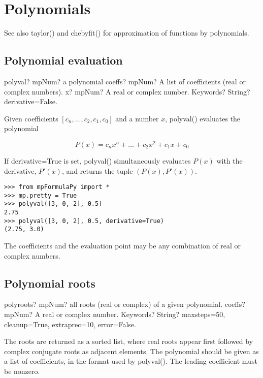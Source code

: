 
\chapter{Polynomials}
See also taylor() and chebyfit() for approximation of functions by polynomials.

\section{Polynomial evaluation}


\begin{mpFunctionsExtract}
	\mpFunctionThree
	{polyval? mpNum? a polynomial }
	{coeffs? mpNum? A list of coefficients (real or complex numbers).}
	{x? mpNum? A real or complex number.}	
	{Keywords? String? derivative=False.}	
\end{mpFunctionsExtract}




\vpara
Given coefficients $[c_n,\ldots,c_2,c_1,c_0]$ and a number $x$, polyval() evaluates the polynomial 

\begin{equation}
P(x)=c_n x^n + \ldots + c_2 x^2 + c_1 x + c_0
\end{equation}

If derivative=True is set, polyval() simultaneously evaluates $P(x)$ with the derivative, $P'(x)$, and returns the tuple $(P(x),P'(x))$.

\begin{lstlisting}
>>> from mpFormulaPy import *
>>> mp.pretty = True
>>> polyval([3, 0, 2], 0.5)
2.75
>>> polyval([3, 0, 2], 0.5, derivative=True)
(2.75, 3.0)
\end{lstlisting}

The coefficients and the evaluation point may be any combination of real or complex numbers.


\newpage
\section{Polynomial roots}


\begin{mpFunctionsExtract}
	\mpFunctionTwo
	{polyroots? mpNum? all roots (real or complex) of a given polynomial.}
	{coeffs? mpNum? A real or complex number.}
	{Keywords? String? maxsteps=50, cleanup=True, extraprec=10, error=False.}	
\end{mpFunctionsExtract}


\vpara
The roots are returned as a sorted list, where real roots appear first followed by complex conjugate roots as adjacent elements. The polynomial should be given as a list of coefficients, in the format used by polyval(). The leading coefficient must be nonzero.

